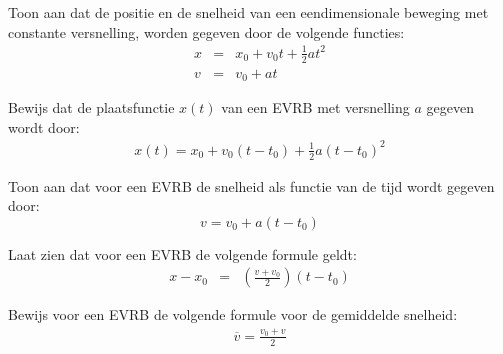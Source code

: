 \documentclass{ximera}
\begin{document}
        \author{Bert Lambregs}

\begin{exercise} Toon aan dat de positie en de snelheid van een eendimensionale beweging met constante versnelling, worden gegeven door de volgende functies:
\begin{eqnarray*}
x&=&x_0+v_0t+\frac{1}{2}at^2\\
v&=&v_0+at 
\end{eqnarray*}

\end{exercise}

\begin{exercise} Bewijs dat de plaatsfunctie $x(t)$ van een EVRB met versnelling $a$ gegeven wordt door:
\begin{eqnarray*}
x(t)=x_0+v_0(t-t_0)+\frac{1}{2}a(t-t_0)^2
\end{eqnarray*}

\end{exercise}

\begin{exercise} Toon aan dat voor een EVRB de snelheid als functie van de tijd wordt gegeven door:
\[v=v_0+a(t-t_0)\]



\end{exercise}

\begin{exercise} Laat zien dat voor een EVRB de volgende formule geldt:
\begin{eqnarray*}
x-x_0&=&\left(\frac{v+v_0}{2}\right)(t-t_0)
\end{eqnarray*}

\end{exercise}

\begin{exercise} Bewijs voor een EVRB de volgende formule voor de gemiddelde snelheid:
\begin{eqnarray*}
\overline{v}=\frac{v_0+v}{2}
\end{eqnarray*}


\end{exercise}
\end{document}
